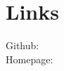 \documentclass[]{deedy-resume-openfont}
\begin{document}
\begin{minipage}[t]{0.33\textwidth}
\sectionsep


\section{Links} 
Github: \href{https://github.com/tycheng}{} \\
Homepage: \href{http://tycheng.github.io}{} \\

\sectionsep

%
%

\end{minipage} 
\hfill
\end{document}
